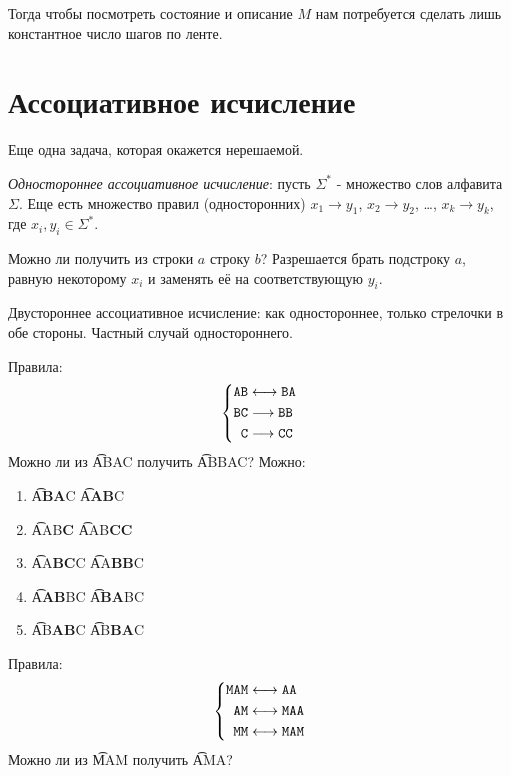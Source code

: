 Тогда чтобы посмотреть состояние и описание $M$ нам потребуется сделать лишь константное число шагов по ленте.

\section{Ассоциативное исчисление}
Еще одна задача, которая окажется нерешаемой.

\begin{Def}
	\textit{Одностороннее ассоциативное исчисление}:
	пусть $\Sigma^{*}$ - множество слов алфавита $\Sigma$.
	Еще есть множество правил (односторонних) $x_1 \rightarrow y_1$, $x_2 \rightarrow y_2$, \dots, $x_k \rightarrow y_k$,
	где $x_i, y_i \in \Sigma^{*}$.
	
	Можно ли получить из строки $a$ строку $b$?
	Разрешается брать подстроку $a$, равную некоторому $x_i$ и заменять её на соответствующую $y_i$.
\end{Def}
\begin{Def}
    Двустороннее ассоциативное исчисление: как одностороннее, только стрелочки в обе стороны.
    Частный случай одностороннего.
\end{Def}

\begin{exmp}
	Правила:
	\[\left\{
	\begin{aligned}
	\texttt{AB} &\longleftrightarrow \texttt{BA} \\
	\texttt{BC} &\longrightarrow \texttt{BB} \\
	\texttt{C} &\longrightarrow \texttt{CC} \\
	\end{aligned}
	\right.\]
	Можно ли из \t{ABAC} получить \t{ABBAC}?
	Можно:
	\begin{enumerate}
	\item \t{A\textbf{BA}C} \to \t{A\textbf{AB}C}
	\item \t{AAB\textbf{C}} \to \t{AAB\textbf{CC}}
	\item \t{AA\textbf{BC}C} \to \t{AA\textbf{BB}C}
	\item \t{A\textbf{AB}BC} \to \t{A\textbf{BA}BC}
	\item \t{AB\textbf{AB}C} \to \t{AB\textbf{BA}C}
	\end{enumerate}
\end{exmp}

\begin{exmp}
	Правила:
	\[\left\{
	\begin{aligned}
	\texttt{MAM} &\longleftrightarrow \texttt{AA} \\
	\texttt{AM} &\longleftrightarrow \texttt{MAA} \\
	\texttt{MM} &\longleftrightarrow \texttt{MAM}
	\end{aligned}
	\right.\]
	Можно ли из \t{MAM} получить \t{AMA}?
\end{exmp}

